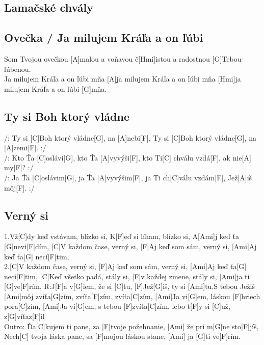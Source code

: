 \documentclass[10pt]{article}
\begin{document}
\begin{Large}
\newpage

\begin{minipage}{\textwidth}
\section{Lamačské chvály}
\begin{multicols}{2}
\subsection{Ovečka / Ja milujem Kráľa a on ľúbi}
\begin{guitar}	
	[D]Som Tvojou ovečkou	
	[A]malou a voňavou	
	č[Hmi]istou a radostnou 
	[G]Tebou ľúbenou.
	\\
	[D]Ja milujem Kráľa a on ľúbi mňa
	[A]ja milujem Kráľa a on ľúbi mňa
	[Hmi]ja milujem Kráľa a on ľúbi [G]mňa.
\end{guitar}
\columnbreak
\subsection{Ty si Boh ktorý vládne}
\begin{guitar}	
	/: Ty si [C]Boh ktorý vládne[G], na [A]nebi[F],  
	Ty si [C]Boh ktorý vládne[G], na [A]zemi[F]. :/ 
	\\
	/: Kto Ťa [C]oslávi[G], kto Ťa [A]vyvýši[F], 
	kto Ti[C] chválu vzdá[F], ak nie[A] my[F]? :/
	\\
	/: Ja Ťa [C]oslávim[G], ja Ťa [A]vyvýšim[F],
	ja Ti ch[C]válu vzdám[F], Jež[A]iš môj[F]. :/
\end{guitar}
\end{multicols}
\end{minipage}

\begin{minipage}{\textwidth}
\subsection{Verný si}
\begin{multicols*}{2}
\begin{guitar}
	1.Vž[C]dy keď vstávam, blízko si,
	K[F]eď si líham, blízko si,
	A[Ami]j keď ťa [G]nevi[F]dím,
	[C]V každom čase, verný si,
	[F]Aj keď som sám, verný si,
	[Ami]Aj keď ťa[G] necí[F]tim,
	\\
	2.[C]V každom čase, verný si,
	[F]Aj keď som sám, verný si,
	[Ami]Aj keď ťa[G] necí[F]tim,
	[C]Keď všetko padá, stály si,
	[F]v každej zmene, stály si,
	[Ami]ja ti [G]ve[F]rím,
	\columnbreak
	R:J[F]a v[G]iem, že si [C]tu,
	[F]Jež[G]iš, ty si [Ami]tu.S tebou Ježiš [Ami]môj
	zvíťa[G]zím, zvíťa[F]zím, zvíťa[C]zím,
	[Ami]Ja vi[G]em, láskou [F]hriech pora[C]zím,
	[Ami]Ja vi[G]em, s tebou [F]zvíťa[C]zím,
	lebo t[F]y si [C]už, z[G]víťaz[F]il
	\\
	Outro:
	Ďa[C]kujem ti pane, 
	za [F]tvoje požehnanie, 
	[Ami] že pri m[G]ne sto[F]jíš,
	Nech[C] tvoja láska pane, 
	sa [F]mojou láskou stane,
	[Ami] ja [G]ti ve[F]rím.
\end{guitar}
\end{multicols*}
\end{minipage}


\end{Large}
\end{document}
